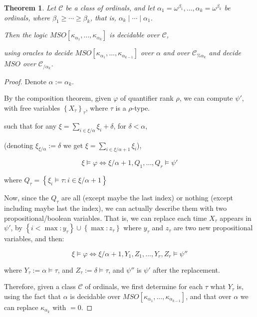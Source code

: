 \documentclass{article}
\newtheorem{theorem}{Theorem}
\newcommand{\brackets}[1]{\left[ {#1} \right]}
\newcommand{\braces}[1]{\left\{ {#1} \right\}}
\newcommand{\setcomp}[1]{\braces{#1}}
\newcommand{\kk}[1]{{\kappa}_{#1}}
\newcommand{\CC}{\mathcal{C}}
\begin{document}
\begin{theorem}
    Let $\CC$ be a class of ordinals,
    and let $\alpha_1=\omega^{\beta_1}, ..., \alpha_k=\omega^{\beta_k}$ be ordinals,
    where $\beta_1 \ge \cdots \ge \beta_k$, that is, $\alpha_k \mid \cdots \mid \alpha_1$.
    
    Then the logic $MSO \brackets{\kk{\alpha_1}, ..., \kk{\alpha_k}}$
    is decidable over $\CC$,

    using oracles to decide $MSO \brackets{\kk{\alpha_1}, ..., \kk{\alpha_{k-1}}}$
    over $\alpha$ and over $\CC_{\% \alpha_k}$ and
    decide $MSO$ over $\CC_{/\alpha_k}$.
\end{theorem}

\begin{proof}
    Denote $\alpha := \alpha_k$.

    By the composition theorem, given $\varphi$ of quantifier rank $\rho$,
    we can compute $\psi'$,
    with free variables $\braces{X_\tau}_\tau$,
    where $\tau$ is a $\rho$-type.

    such that for any $\xi = \sum_{i \in \xi / \alpha} \xi_i + \delta$,
    for $\delta < \alpha$,
    
    (denoting $\xi_{\xi / \alpha} := \delta$ we get $\xi = \sum_{i \in \xi / \alpha + 1} \xi_i$),
    
    $$
    \xi \vDash \varphi \iff \xi/\alpha + 1, Q_1, ..., Q_r\vDash \psi'
    $$

    where $Q_\tau = \setcomp{\xi_i \vDash \tau : i \in \xi / \alpha + 1}$

    Now, since the $Q_\tau$ are all (except maybe the last index) or
    nothing (except including maybe last the index),
    we can actually describe them with two propositional/boolean variables.
    That is, we can replace each time $X_\tau$ appears in $\psi'$,
    by $\setcomp{i < \max : y_\tau} \cup \setcomp{\max : z_\tau}$
    where $y_\tau$ and $z_\tau$ are two new propositional variables, and then:

    $$
    \xi \vDash \varphi \iff \xi/\alpha + 1, Y_1, Z_1, ..., Y_r, Z_r\vDash \psi''
    $$

    where $Y_\tau := \alpha \vDash \tau$,
    and $Z_\tau := \delta \vDash \tau$,
    and $\psi''$ is $\psi'$ after the replacement.

    Therefore, given a class $\CC$ of ordinals,
    we first determine for each $\tau$ what $Y_\tau$ is,
    using the fact that $\alpha$ is decidable over $MSO \brackets{\kk{\alpha_1}, ..., \kk{\alpha_{k-1}}}$,
    and that over $\alpha$ we can replace $\kk{\alpha_k}$ with $=0$.


\end{proof}
\end{document}

